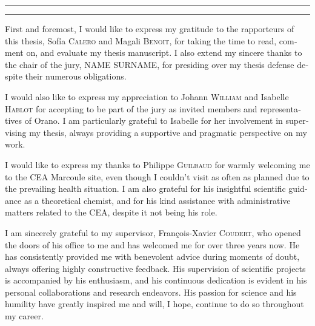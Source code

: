 \begin{otherlanguage}{english}

\hrule\relax
\vspace*{.9\baselineskip}%
\raggedright{\huge{}}\par%
\vspace*{1.1\baselineskip}%
\hrule\relax
\vspace*{\baselineskip}%
\thispagestyle{empty}

\begingroup
\itshape

First and foremost, I would like to express my gratitude to the rapporteurs of this thesis, Sof{\'{i}}a \textsc{Calero} and Magali \textsc{Benoit}, for taking the time to read, comment on, and evaluate my thesis manuscript. 
I also extend my sincere thanks to the chair of the jury, NAME SURNAME, for presiding over my thesis defense despite their numerous obligations.

I would also like to express my appreciation to Johann \textsc{William} and Isabelle \textsc{Hablot} for accepting to be part of the jury as invited members and representatives of Orano. I am particularly grateful to Isabelle for her involvement in supervising my thesis, always providing a supportive and pragmatic perspective on my work.

I would like to express my thanks to Philippe \textsc{Guilbaud} for warmly welcoming me to the CEA Marcoule site, even though I couldn't visit as often as planned due to the prevailing health situation. I am also grateful for his insightful scientific guidance as a theoretical chemist, and for his kind assistance with administrative matters related to the CEA, despite it not being his role.

I am sincerely grateful to my supervisor, François-Xavier \textsc{Coudert}, who opened the doors of his office to me and has welcomed me for over three years now. He has consistently provided me with benevolent advice during moments of doubt, always offering highly constructive feedback. His supervision of scientific projects is accompanied by his enthusiasm, and his continuous dedication is evident in his personal collaborations and research endeavors. His passion for science and his humility have greatly inspired me and will, I hope, continue to do so throughout my career.


\end{otherlanguage}
